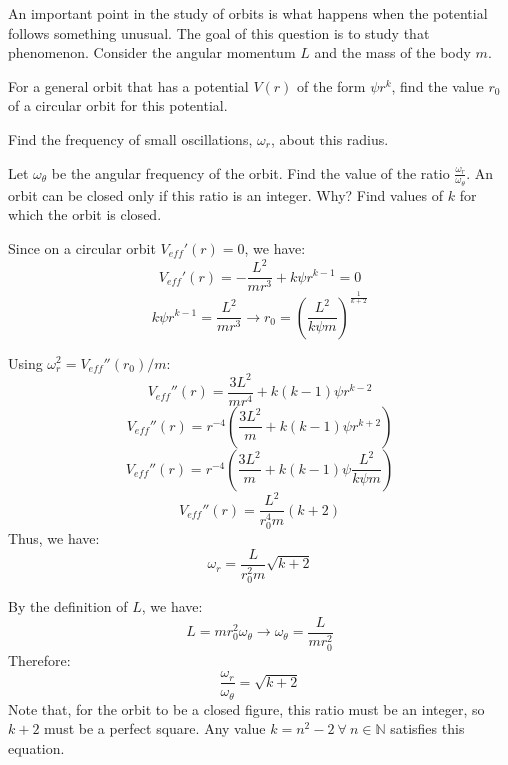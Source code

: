 \documentclass[11pt]{article}
\begin{document}
\begin{pproblem} An important point in the study of orbits is what happens when the potential follows something unusual. The goal of this question is to study that phenomenon. Consider the angular momentum \(L\) and the mass of the body \(m\).
    \begin{alternativas}
        \item For a general orbit that has a potential \(V(r)\) of the form \(\psi r^k\), find the value \(r_0\) of a circular orbit for this potential.
        
        \item Find the frequency of small oscillations, \(\omega_r\), about this radius. 
        
        \item Let \(\omega_\theta\) be the angular frequency of the orbit. Find the value of the ratio \(\frac{\omega_r}{\omega_\theta}\). An orbit can be closed only if this ratio is an integer. Why? Find values of \(k\) for which the orbit is closed.
         
    \end{alternativas} 

    \begin{pssolution*}{}{}
        \begin{alternativas}
            \item Since on a circular orbit \(V_{eff}'(r) = 0\), we have:
            \[V_{eff}'(r) = -\frac{L^2}{mr^3}+k\psi r^{k-1} = 0\]
            \[k\psi r^{k-1} = \frac{L^2}{mr^3} \rightarrow \boxed{r_0 = \left(\frac{L^2}{k\psi m}\right)^{\frac{1}{k+2}}}\]
        
            \item Using \(\omega_r^2=V_{eff}''(r_0)/m\):
            \[V_{eff}''(r) = \frac{3L^2}{mr^4}+k(k-1)\psi r^{k-2}\]
            \[V_{eff}''(r) = r^{-4}\left(\frac{3L^2}{m}+k(k-1)\psi r^{k+2}\right)\]
            \[V_{eff}''(r) = r^{-4}\left(\frac{3L^2}{m}+k(k-1)\psi \frac{L^2}{k\psi m}\right)\]
            \[V_{eff}''(r) = \frac{L^2}{r_0^4m}(k+2)\]
            Thus, we have:
            \[\boxed{\omega_r = \frac{L}{r_0^2m}\sqrt{k+2}}\]

            \item By the definition of \(L\), we have:
            \[L = mr_0^2\omega_\theta \rightarrow \omega_\theta = \frac{L}{mr_0^2}\]
            Therefore:
            \[\frac{\omega_r}{\omega_\theta} = \sqrt{k+2}\]
            Note that, for the orbit to be a closed figure, this ratio must be an integer, so \(k+2\) must be a perfect square. Any value \(k = n^2-2 \ \forall \ n \in \mathbb{N}\) satisfies this equation.
        \end{alternativas}
    \end{pssolution*}
\end{pproblem}
\end{document}
